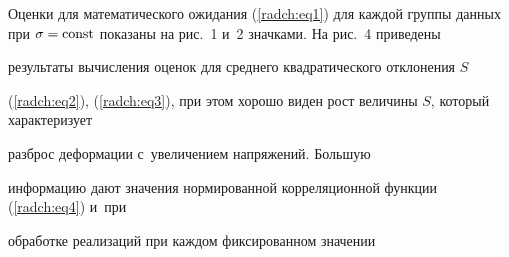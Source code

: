 Оценки для математического ожидания (\ref{radch:eq1}) для каждой группы данных при $\sigma 

= \rm const$ показаны на рис.~1 и~2 значками. На рис.~4 приведены 

результаты вычисления оценок для среднего квадратического отклонения $S$ 

(\ref{radch:eq2}), (\ref{radch:eq3}), при этом хорошо виден рост величины $S$, который характеризует 

разброс деформации с~увеличением напряжений. Большую 

информацию дают значения нормированной корреляционной функции (\ref{radch:eq4}) и~при 

обработке реализаций при каждом фиксированном значении 







